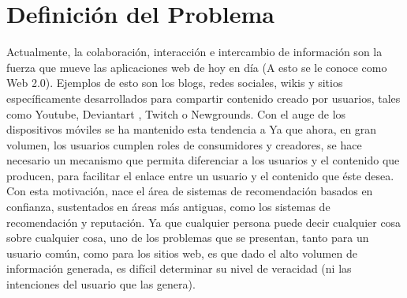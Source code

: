 \chapter{Definici\'on del Problema}

Actualmente, la colaboración, interacción e intercambio de información son la fuerza que mueve las aplicaciones web de hoy en día (A esto se le conoce como Web 2.0).  Ejemplos de esto son los blogs, redes sociales, wikis y sitios específicamente desarrollados para compartir contenido creado por usuarios, tales como Youtube, Deviantart ,  Twitch o Newgrounds. 
Con el auge de los dispositivos móviles se ha mantenido esta tendencia a
Ya que ahora, en gran volumen, los usuarios cumplen roles de consumidores y creadores, se hace necesario un mecanismo que permita diferenciar a los usuarios y el contenido que producen, para facilitar el enlace entre un usuario y el contenido que éste desea.
Con esta motivación, nace el área de sistemas de recomendación basados en confianza, sustentados en áreas más antiguas, como los sistemas de recomendación y reputación.
Ya que cualquier persona puede decir cualquier cosa sobre cualquier cosa, uno de los problemas que se presentan, tanto para un usuario común, como para los sitios web, es que dado el alto volumen de información generada, es difícil determinar su nivel de veracidad (ni las intenciones del usuario que las genera).
